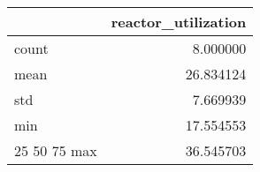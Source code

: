 \begin{tabular}{lr}
\toprule
 & reactor\_utilization \\
\midrule
count & 8.000000 \\
mean & 26.834124 \\
std & 7.669939 \\
min & 17.554553 \\
25%
50%
75%
max & 36.545703 \\
\bottomrule
\end{tabular}

